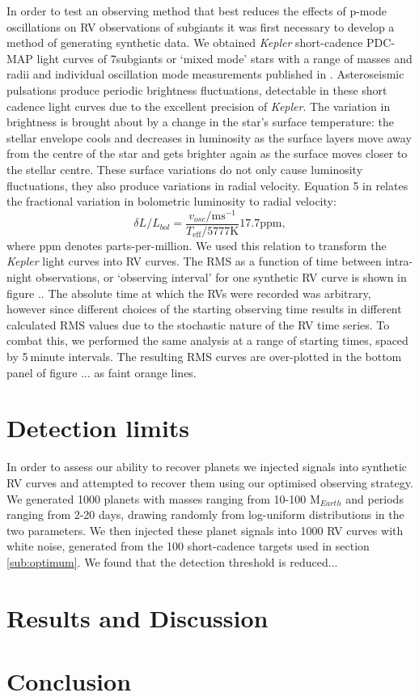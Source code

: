 \documentclass[useAMS, usenatbib]{aastex}
\newcommand{\integer}{5}
\newcommand{\nsubs}{7}
\begin{document}
In order to test an observing method that best reduces the effects of p-mode
oscillations on RV observations of subgiants it was first necessary to develop
a method of generating synthetic data.
We obtained {\it Kepler} short-cadence PDC-MAP light curves
\citep[][]{Smith2012, Stumpe2012} of \nsubs subgiants or `mixed mode' stars
with a range of masses and radii and individual oscillation mode measurements
published in \citet{Appourchaux2012}.
Asteroseismic pulsations produce periodic brightness fluctuations, detectable
in these short cadence light curves due to the excellent precision of
{\it Kepler}.
The variation in brightness is brought about by a change in the star's surface
temperature: the stellar envelope cools and decreases in luminosity as the
surface layers move away from the centre of the star and gets brighter again
as the surface moves closer to the stellar centre.
These surface variations do not only cause luminosity fluctuations, they also
produce variations in radial velocity.
Equation 5 in \citet{Kjeldsen1995} relates the fractional variation in
bolometric luminosity to radial velocity:
\begin{equation}
	\delta L/L_{bol} = \frac{v_{osc}/\mathrm{ms}^{-1}}
	{T_{\mathrm{eff}}/5777\mathrm{K}}17.7\mathrm{ppm},
\end{equation}
where ppm denotes parts-per-million.
We used this relation to transform the {\it Kepler} light curves into RV
curves.
The RMS as a function of time between intra-night observations, or
`observing interval' for one synthetic RV curve is shown in figure ..
The absolute time at which the RVs were recorded was arbitrary, however since
different choices of the starting observing time results in different
calculated RMS values due to the stochastic nature of the RV time series.
To combat this, we performed the same analysis at a range of
starting times, spaced by \integer$~$minute intervals.
The resulting RMS curves are over-plotted in the bottom panel of figure ...
as faint orange lines.

\section{Detection limits}
\label{section:detection}

In order to assess our ability to recover planets we injected signals into
synthetic RV curves and attempted to recover them using our optimised observing
strategy.
We generated 1000 planets with masses ranging from 10-100 M$_{Earth}$ and
periods ranging from 2-20 days, drawing randomly from log-uniform
distributions in the two parameters.
We then injected these planet signals into 1000 RV curves with white noise,
generated from the 100 short-cadence targets used in section \ref{sub:optimum}.
We found that the detection threshold is reduced...

\section{Results and Discussion}
\label{results}

\section{Conclusion}
\label{conclusion}



\end{document}
